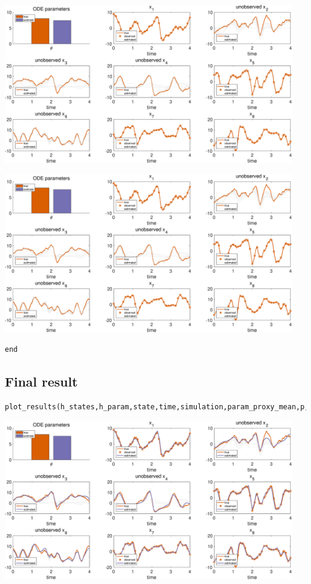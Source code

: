 {\includegraphics [width=5in]{Lorenz96_2_13.eps}

\includegraphics [width=5in]{Lorenz96_2_14.eps}
}

\color{black}
\color{RoyalPurple}\begin{verbatim}
end
\end{verbatim}
\color{black}
\begin{par}
\subsection{ Final result }
\end{par} \vspace{1em}
\color{RoyalPurple}\begin{verbatim}
plot_results(h_states,h_param,state,time,simulation,param_proxy_mean,p,symbols,'final');
\end{verbatim}
\color{black}

{
\centering
\includegraphics [width=5in]{Lorenz96_2_15.eps}
}

